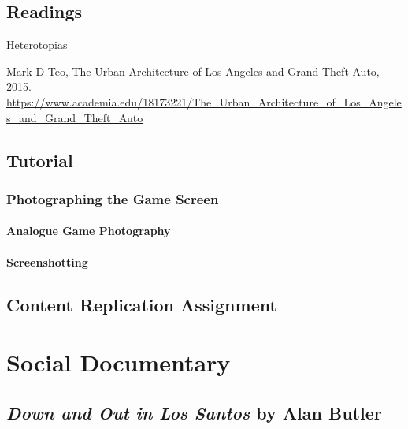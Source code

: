 \documentclass[
  openany]{book}
\begin{document}
\hypertarget{readings}{%
\section{Readings}\label{readings}}

\href{https://www.heterotopiaszine.com/}{Heterotopias}

Mark D Teo, The Urban Architecture of Los Angeles and Grand Theft Auto, 2015. \url{https://www.academia.edu/18173221/The_Urban_Architecture_of_Los_Angeles_and_Grand_Theft_Auto}

\hypertarget{tutorial}{%
\section{Tutorial}\label{tutorial}}

\hypertarget{photographing-the-game-screen}{%
\subsection{Photographing the Game Screen}\label{photographing-the-game-screen}}

\hypertarget{analogue-game-photography}{%
\subsubsection{Analogue Game Photography}\label{analogue-game-photography}}

\hypertarget{screenshotting}{%
\subsubsection{Screenshotting}\label{screenshotting}}

\hypertarget{content-replication-assignment}{%
\section{Content Replication Assignment}\label{content-replication-assignment}}

\hypertarget{social-documentary}{%
\chapter{Social Documentary}\label{social-documentary}}

\hypertarget{down-and-out-in-los-santos-by-alan-butler}{%
\section{\texorpdfstring{\emph{Down and Out in Los Santos} by Alan Butler}{Down and Out in Los Santos by Alan Butler}}\label{down-and-out-in-los-santos-by-alan-butler}}
\end{document}
